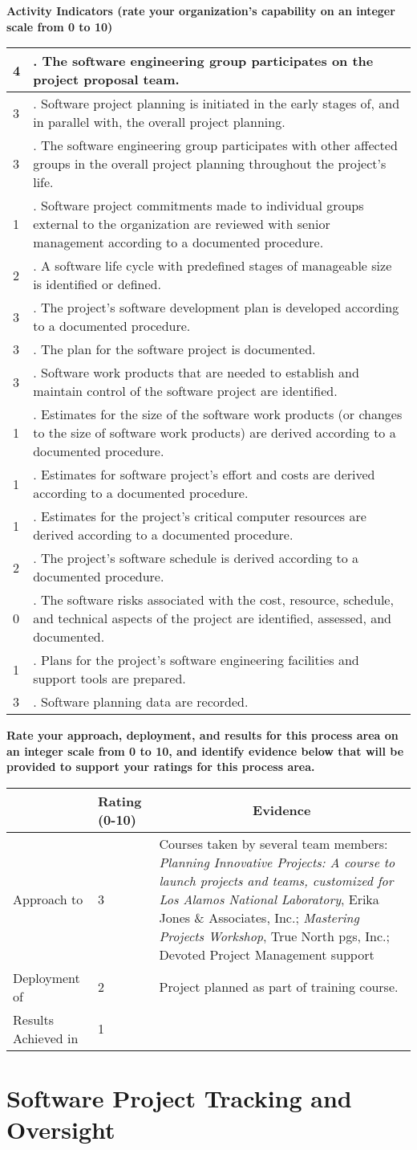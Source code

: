 \documentclass{article}
\newcommand{\KPAname}{}
\newenvironment{KPARate}[1]
	{\renewcommand{\KPAname}{#1}
	 {\bf Rate your approach, deployment, and results for
	  this process area on an integer scale from 0 to 10, and 
	  identify evidence below that will be provided to support your
	  ratings for this process area.}
	 \begin{center}
	 \begin{tabular}{|p{1.0in}|p{0.5in}|p{5.0in}|} \hline
	 & Rating (0-10) & \multicolumn{1}{c|}{Evidence} \\ \hline}
	{\end{tabular}
	 \end{center}}
\newcommand{\Approach}[2]{Approach to \KPAname & #1 & #2 \\ \hline}
\newcommand{\Deployment}[2]{Deployment of \KPAname & #1 & #2 \\ \hline}
\newcommand{\Results}[2]{Results Achieved in \KPAname & #1 & #2 \\
	\hline}
\newcounter{activity}
\newenvironment{KPAActivity}
	{
	 \setcounter{activity}{0}
	 {\bf Activity Indicators (rate your organization's capability
	 on an integer scale from 0 to 10)}
	 \begin{center}
	 \begin{tabular}{|p{0.5in}|p{6.0in}|} \hline
	}
	{
	 \end{tabular}
	 \end{center}
	}
\newcommand{\Activity}[2]{\stepcounter{activity} #1 &
\arabic{activity}. #2 \\ \hline}
\begin{document}
\begin{KPAActivity}
\Activity{4}{The software engineering group participates on the
project proposal team.}
\Activity{3}{Software project planning is initiated in the early
stages of, and in parallel with, the overall project planning.}
\Activity{3}{The software engineering group participates with other
affected groups in the overall project planning throughout the
project's life.}
\Activity{1}{Software project commitments made to individual groups
external to the organization are reviewed with senior management
according to a documented procedure.}
\Activity{2}{A software life cycle with predefined stages of
manageable size is identified or defined.}
\Activity{3}{The project's software development plan is developed
according to a documented procedure.}
\Activity{3}{The plan for the software project is documented.}
\Activity{3}{Software work products that are needed to establish
and maintain control of the software project are identified.}
\Activity{1}{Estimates for the size of the software work products (or
changes to the size of software work products) are derived according
to a documented procedure.}
\Activity{1}{Estimates for software project's effort and costs are
derived according to a documented procedure.}
\Activity{1}{Estimates for the project's critical computer
resources are derived according to a documented procedure.}
\Activity{2}{The project's software schedule is derived according
to a documented procedure.}
\Activity{0}{The software risks associated with the cost,
resource, schedule, and technical aspects of the project are
identified, assessed, and documented.}
\Activity{1}{Plans for the project's software engineering
facilities and support tools are prepared.}
\Activity{3}{Software planning data are recorded.}
\end{KPAActivity}

\begin{KPARate}{Software Project Planning}
\Approach{3}{Courses taken by several team members: 
             {\em Planning Innovative Projects: A course to launch
             projects and teams, customized for Los Alamos National
             Laboratory}, Erika Jones \& Associates, Inc.; 
             {\em Mastering Projects Workshop}, True North pgs, Inc.;
             Devoted Project Management support}
\Deployment{2}{Project planned as part of training course.}
\Results{1}{}
\end{KPARate}

\newpage
\section{Software Project Tracking and Oversight}
\end{document}
